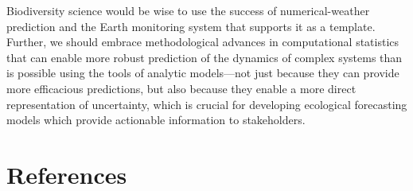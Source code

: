 \documentclass[10pt,oneside]{article}
\begin{document}
Biodiversity science would be wise to use the success of
numerical-weather prediction and the Earth monitoring system that
supports it as a template. Further, we should embrace methodological
advances in computational statistics that can enable more robust
prediction of the dynamics of complex systems than is possible using the
tools of analytic models---not just because they can provide more
efficacious predictions, but also because they enable a more direct
representation of uncertainty, which is crucial for developing
ecological forecasting models which provide actionable information to
stakeholders.

\hypertarget{references}{%
\section*{References}\label{references}}
\end{document}
